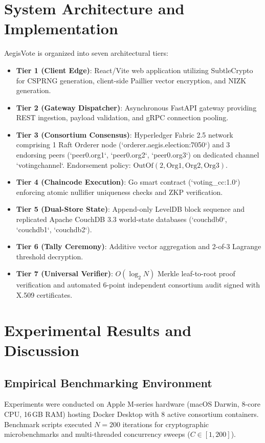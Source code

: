 \documentclass[journal,10pt,twocolumn]{IEEEtran}
\begin{document}
\section{System Architecture and Implementation}
AegisVote is organized into seven architectural tiers:
\begin{itemize}
    \item \textbf{Tier 1 (Client Edge)}: React/Vite web application utilizing SubtleCrypto for CSPRNG generation, client-side Paillier vector encryption, and NIZK generation.
    \item \textbf{Tier 2 (Gateway Dispatcher)}: Asynchronous FastAPI gateway providing REST ingestion, payload validation, and gRPC connection pooling.
    \item \textbf{Tier 3 (Consortium Consensus)}: Hyperledger Fabric 2.5 network comprising 1 Raft Orderer node (`orderer.aegis.election:7050`) and 3 endorsing peers (`peer0.org1`, `peer0.org2`, `peer0.org3`) on dedicated channel `votingchannel`. Endorsement policy: $\text{OutOf}(2, \text{Org1}, \text{Org2}, \text{Org3})$.
    \item \textbf{Tier 4 (Chaincode Execution)}: Go smart contract (`voting_cc:1.0`) enforcing atomic nullifier uniqueness checks and ZKP verification.
    \item \textbf{Tier 5 (Dual-Store State)}: Append-only LevelDB block sequence and replicated Apache CouchDB 3.3 world-state databases (`couchdb0`, `couchdb1`, `couchdb2`).
    \item \textbf{Tier 6 (Tally Ceremony)}: Additive vector aggregation and 2-of-3 Lagrange threshold decryption.
    \item \textbf{Tier 7 (Universal Verifier)}: $O(\log_2 N)$ Merkle leaf-to-root proof verification and automated 6-point independent consortium audit signed with X.509 certificates.
\end{itemize}

\section{Experimental Results and Discussion}

\subsection{Empirical Benchmarking Environment}
Experiments were conducted on Apple M-series hardware (macOS Darwin, 8-core CPU, 16\,GB RAM) hosting Docker Desktop with 8 active consortium containers. Benchmark scripts executed $N=200$ iterations for cryptographic microbenchmarks and multi-threaded concurrency sweeps ($C \in [1, 200]$).
\end{document}
